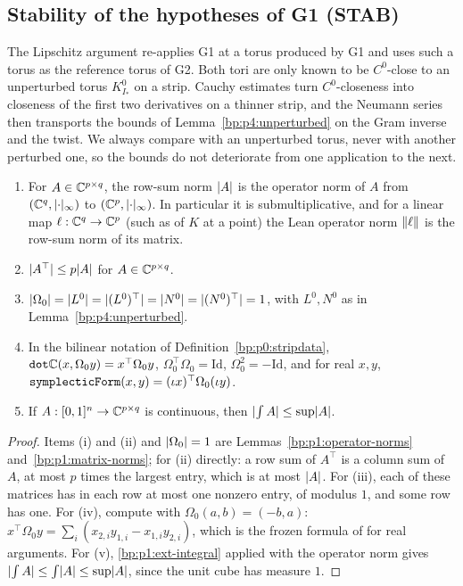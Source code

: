 \subsection{Stability of the hypotheses of G1 (STAB)}\label{bp:p4:sec-stab}

The Lipschitz argument re-applies G1 at a torus produced by G1 and uses such a torus as the
reference torus of G2. Both tori are only known to be $C^0$-close to an unperturbed torus
$K^0_{I_*}$ on a strip. Cauchy estimates turn $C^0$-closeness into closeness of the first two
derivatives on a thinner strip, and the Neumann series then transports the bounds of
Lemma~\ref{bp:p4:unperturbed} on the Gram inverse and the twist. We always compare with an
unperturbed torus, never with another perturbed one, so the bounds do not deteriorate from one
application to the next.

\begin{corollary}\label{bp:p4:matrix-norms}
\begin{enumerate}[label=(\roman*)]
\item For $A\in\mathbb{C}^{p\times q}$, the row-sum norm $\lvert A\rvert$ is the operator norm of $A$ from
  $(\mathbb{C}^q,\lvert \cdot\rvert_\infty)$ to $(\mathbb{C}^p,\lvert \cdot\rvert_\infty)$. In particular it is submultiplicative,
  and for a linear map $\ell:\mathbb{C}^q\to\mathbb{C}^p$ (such as  of $K$ at a point) the Lean
  operator norm $\lVert \ell\rVert$ is the row-sum norm of its matrix.
\item $\lvert A^\top\rvert\le p\lvert A\rvert$ for $A\in\mathbb{C}^{p\times q}$.
\item $\lvert \Omega_0\rvert=\lvert L^0\rvert=\lvert (L^0)^\top\rvert=\lvert N^0\rvert=\lvert (N^0)^\top\rvert=1$, with $L^0,N^0$
  as in Lemma~\ref{bp:p4:unperturbed}.
\item In the bilinear notation of Definition~\ref{bp:p0:stripdata},
  $\texttt{dot\ensuremath{\mathbb{C}}}(x,\Omega_0y)=x^\top\Omega_0y$, $\Omega_0^\top\Omega_0=\mathrm{Id}$,
  $\Omega_0^2=-\mathrm{Id}$, and for real $x,y$,
  $\texttt{symplecticForm}(x,y)=(\iota x)^\top\Omega_0(\iota y)$.
\item If $A:[0,1]^n\to\mathbb{C}^{p\times q}$ is continuous, then $\lvert \int A\rvert\le\sup\lvert A\rvert$.
\end{enumerate}
\end{corollary}

\begin{proof}
\label{step:p4:mn-rowsum}
Items (i) and (ii) and $\lvert \Omega_0\rvert=1$ are Lemmas~\ref{bp:p1:operator-norms}
and~\ref{bp:p1:matrix-norms}; for (ii) directly: a row sum of $A^\top$ is a column sum of $A$, at
most $p$ times the largest entry, which is at most $\lvert A\rvert$. For (iii), each of these matrices has in each
row at most one nonzero entry, of modulus $1$, and some row has one. For (iv), compute with
$\Omega_0(a,b)=(-b,a)$: $x^\top\Omega_0y=\sum_i(x_{2,i}y_{1,i}-x_{1,i}y_{2,i})$, which is the frozen
formula of  for real arguments. For (v), \ref{bp:p1:ext-integral} applied with the
operator norm gives $\lvert \int A\rvert\le\int\lvert A\rvert\le\sup\lvert A\rvert$, since the unit cube has measure $1$.
\end{proof}

